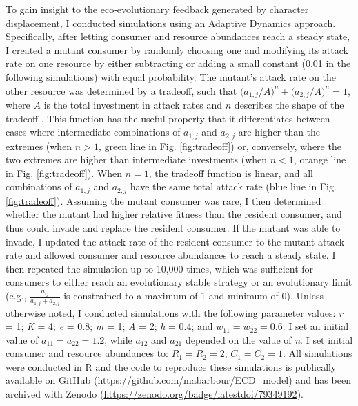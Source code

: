 \documentclass[11pt,]{article}
\begin{document}
To gain insight to the eco-evolutionary feedback generated by character
displacement, I conducted simulations using an Adaptive Dynamics
approach. Specifically, after letting consumer and resource abundances
reach a steady state, I created a mutant consumer by randomly choosing
one and modifying its attack rate on one resource by either subtracting
or adding a small constant (0.01 in the following simulations) with
equal probability. The mutant's attack rate on the other resource was
determined by a tradeoff, such that
\(\big(a_{\text{1},j}/{A}\big)^n+\big(a_{\text{2},j}/{A}\big)^n=1\),
where \(A\) is the total investment in attack rates and \(n\) describes
the shape of the tradeoff \citep{Sargent2006}. This function has the
useful property that it differentiates between cases where intermediate
combinations of \(a_{\text{1},j}\) and \(a_{\text{2},j}\) are higher
than the extremes (when \(n>1\), green line in Fig. \ref{fig:tradeoff})
or, conversely, where the two extremes are higher than intermediate
investments (when \(n<1\), orange line in Fig. \ref{fig:tradeoff}). When
\(n=1\), the tradeoff function is linear, and all combinations of
\(a_{\text{1},j}\) and \(a_{\text{2},j}\) have the same total attack
rate (blue line in Fig. \ref{fig:tradeoff}). Assuming the mutant
consumer was rare, I then determined whether the mutant had higher
relative fitness than the resident consumer, and thus could invade and
replace the resident consumer. If the mutant was able to invade, I
updated the attack rate of the resident consumer to the mutant attack
rate and allowed consumer and resource abundances to reach a steady
state. I then repeated the simulation up to 10,000 times, which was
sufficient for consumers to either reach an evolutionary stable strategy
\citep[ESS,][]{Smith1973} or an evolutionary limit (e.g.,
\(\frac{a_{ij}}{a_{\text{1},j}+a_{\text{2},j}}\) is constrained to a
maximum of 1 and minimum of 0). Unless otherwise noted, I conducted
simulations with the following parameter values: \emph{r} = 1; \emph{K}
= 4; \emph{e} = 0.8; \emph{m} = 1; \emph{A} = 2; \emph{h} = 0.4; and
\(w_{11} = w_{22} = 0.6\). I set an initial value of
\(a_{11} = a_{22} = 1.2\), while \(a_{12}\) and \(a_{21}\) depended on
the value of \emph{n}. I set initial consumer and resource abundances
to: \(R_1 = R_2 = 2\); \(C_1 = C_2 = 1\). All simulations were conducted
in R \citep{R} and the code to reproduce these simulations is publically
available on GitHub (\url{https://github.com/mabarbour/ECD_model}) and
has been archived with Zenodo
(\url{https://zenodo.org/badge/latestdoi/79349192}).
\end{document}
